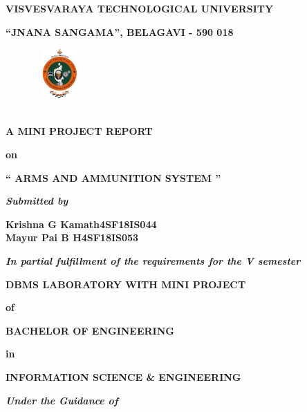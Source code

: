 \documentclass[12pt,a4paper]{report}
\begin{document}
\pagestyle{empty}
\begin{center}
{\large \textbf{VISVESVARAYA TECHNOLOGICAL UNIVERSITY}}
\par
\vspace{3pt}
{\large \textbf{``JNANA SANGAMA'', BELAGAVI - 590 018}}
\begin{figure}[hbtp]
\centering
\includegraphics[width=0.80in,height=0.75in]{../fig/vtu}
\end{figure}
\\
\textbf{A MINI PROJECT REPORT}
\par
\textbf{on}
\par 
\vspace{3pt}
{\Large \textbf{`` ARMS AND AMMUNITION SYSTEM  ''}}
\par
\vspace{8pt}
\textit{\textbf{Submitted by}}
\par
\vspace{6pt}
\textbf{\large Krishna G Kamath}\hspace{0.9in}\textbf{\large \hspace{0.25in}4SF18IS044}\\
\textbf{\large Mayur Pai B H}\hspace{1.5in}\textbf{\large 4SF18IS053}\\
\par
\vspace{3pt}
\textit{\textbf{In partial fulfillment of the requirements for the V semester }}
\par
\vspace{0.5pt}
\Large \textbf{DBMS LABORATORY WITH MINI PROJECT}
\par
\vspace{0.5pt}
\normalsize \centering \textbf{of}
\par
\vspace{0.5pt}
\large \textbf{BACHELOR OF ENGINEERING }
\par
\vspace{0.5pt}
\textbf{in}
\par
\vspace{0.5pt}
\large \textbf{INFORMATION SCIENCE \& ENGINEERING}
\par
\vspace{2pt}
\textit{\textbf{Under the Guidance of}}
\par

\end{center}
\end{document}
